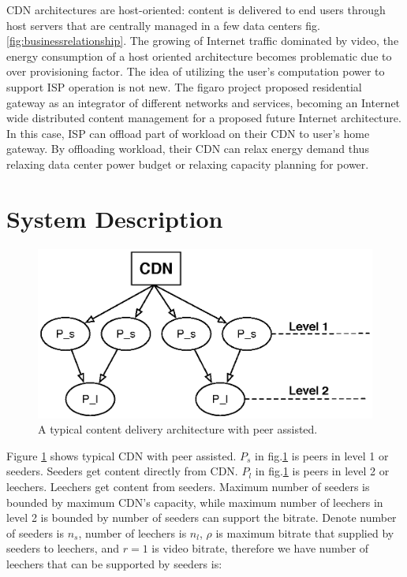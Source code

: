 \documentclass[JIP]{ipsj}
\begin{document}
CDN architectures are host-oriented: content is delivered to end users through host servers that are centrally managed in a few data centers fig.\ref{fig:businessrelationship}. 
The growing of Internet traffic dominated by video, the energy consumption of a host oriented architecture becomes problematic due to over provisioning factor.
The idea of utilizing the user's computation power to support ISP operation is not new. 
The figaro project proposed residential gateway as an integrator of different networks and services, becoming an Internet wide distributed content management for a proposed future Internet architecture.  
In this case, ISP can offload part of workload on their CDN to user's home gateway.  
By offloading workload, their CDN can relax energy demand thus relaxing data center power budget or relaxing capacity planning for power.





\section{System Description}\label{system model}
\begin{figure}[thb]
\begin{center}
\includegraphics[scale=0.5]{graphs/p2p-cdn.eps}
\end{center}
\caption{A typical content delivery architecture with peer assisted.}
\label{fig:iptv}
\vspace{-2mm}
\end{figure} 

Figure \ref{fig:iptv} shows typical CDN with peer assisted.  
$P_s$ in fig.\ref{fig:iptv} is peers in level 1 or seeders.  
Seeders get content directly from CDN.  
$P_l$ in fig.\ref{fig:iptv} is peers in level 2 or leechers.
Leechers get content from seeders.
Maximum number of seeders is bounded by maximum CDN's capacity, while maximum number of leechers in level 2 is bounded by number of seeders can support the bitrate.
Denote number of seeders is $n_s$, number of leechers is $n_l$, $\rho$ is maximum bitrate that supplied by seeders to leechers, and $r=1$ is video bitrate, therefore we have number of leechers that can be supported by seeders is:
\end{document}
